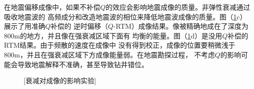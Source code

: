 在地震偏移成像中，如果不补偿$Q$的效应会影响地震成像的质量。非弹性衰减通过吸收地震波的
高频成分和改造地震波的相位来降低地震波成像的质量。图（\ref{fig:qrtm}c）展示了用准确$Q$补偿的
逆时偏移（$Q$-RTM）成像结果。像被精确地成在了深度为800m的地方，并且像在强衰减区域下面有
均衡的能量。图（\ref{fig:qrtm}d）是没用$Q$补偿的RTM结果。由于频散的速度在成像中
没有得到校正，成像的位置要稍微浅于800m，并且在强衰减区域下方成像能量弱。在地震勘探过程，
不考虑$Q$的影响可能会导致地震解释不准确，甚至导致钻井错位。

\begin{figure}[!htbp]
        \centering
		[衰减对成像的影响实验]
        \label{fig:qrtm}
\end{figure}

